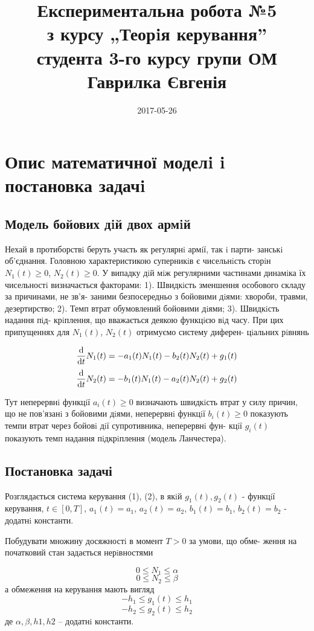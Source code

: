 \documentclass{article}
\title{Експериментальна робота №5 \\
з курсу „Теорiя керування” \\
студента 3-го курсу групи ОМ \\
Гаврилка Євгенія}
\date{2017-05-26}
\begin{document}
\maketitle
\newpage
\section{Опис математичної моделi i постановка задачi}
\subsection{Модель бойових дiй двох армiй}
Нехай в протиборствi беруть участь як регулярнi армiї, так i парти-
занськi об’єднання. Головною характеристикою суперникiв є чисельнiсть
сторiн $N_1(t) \geq 0$, $N_2(t) \geq 0$. У випадку дiй мiж регулярними частинами
динамiка їх чисельностi визначається факторами:
1). Швидкiсть зменшення особового складу за причинами, не зв’я-
заними безпосередньо з бойовими дiями: хвороби, травми, дезертирство;
2). Темп втрат обумовлений бойовими дiями; 3). Швидкiсть надання пiд-
крiплення, що вважається деякою функцiєю вiд часу.
При цих припущеннях для $N_1 (t)$, $N_2 (t)$ отримуємо систему диферен-
цiальних рiвнянь

\begin{equation}
{\frac {\rm d}{{\rm d}t}}N_1(t) = -a_1(t) N_1(t) - b_2(t) N_2(t) + g_1(t)
\end{equation}
\begin{equation}
{\frac {\rm d}{{\rm d}t}}N_2(t) = -b_1(t) N_1(t) - a_2(t) N_2(t) + g_2(t)
\end{equation}

Тут неперервнi функцiї $a_i(t) \geq  0$ визначають швидкiсть втрат у силу
причин, що не пов’язанi з бойовими дiями, неперервнi функцiї $b_i(t) \geq  0$
показують темпи втрат через бойовi дiї супротивника, неперервнi фун-
кцiї $g_i(t)$ показують темп надання пiдкрiплення (модель Ланчестера).

\subsection{Постановка задачі}
Розглядається система керування (1), (2), в якiй $g_1 (t), g_2(t)$ - функцiї керування,
$t \in [0, T]$, $a_1 (t) = a_1$, $a_2(t) = a_2$, $b_1 (t) = b_1$, $b_2 (t) = b_2$ - додатнi константи.

Побудувати множину досяжностi в момент $T > 0$ за умови, що обме-
ження на початковий стан задається нерiвностями

\begin{equation}
0\leq N_1\leq \alpha 
\end{equation}
\begin{equation}
0\leq N_2\leq \beta
\end{equation}
а обмеження на керування мають вигляд
\begin{equation}
-h_1\leq g_1(t)\leq h_1
\end{equation}
\begin{equation}
-h_2\leq g_2(t)\leq h_2
\end{equation}
де $\alpha, \beta, h1, h2$ – додатнi константи.
\end{document}

